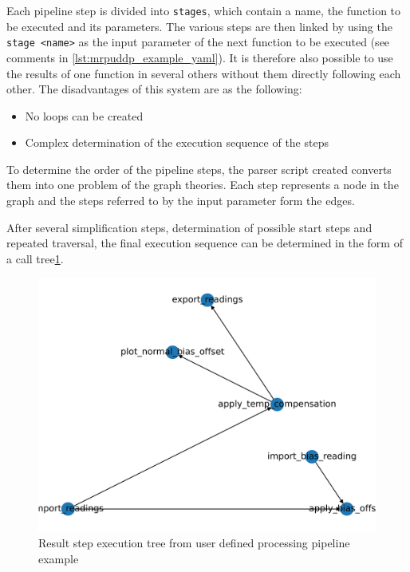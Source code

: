 Each pipeline step is divided into \passthrough{\lstinline!stages!},
which contain a name, the function to be executed and its parameters.
The various steps are then linked by using the
\passthrough{\lstinline!stage <name>!} as the input parameter of the
next function to be executed (see comments in
\ref{lst:mrpuddp_example_yaml}). It is therefore also possible to use
the results of one function in several others without them directly
following each other. The disadvantages of this system are as the
following:

\begin{itemize}
\tightlist
\item
  No loops can be created
\item
  Complex determination of the execution sequence of the steps
\end{itemize}

To determine the order of the pipeline steps, the parser script created
converts them into one problem of the graph theories. Each step
represents a node in the graph and the steps referred to by the input
parameter form the edges.

After several simplification steps, determination of possible start
steps and repeated traversal, the final execution sequence can be
determined in the form of a call
tree\ref{Result_step_execution_tree_from_user_defined_processing_pipeline_example.png}.

\begin{figure}
\centering
\includegraphics{./generated_images/border_Result_step_execution_tree_from_user_defined_processing_pipeline_example.png}
\caption{Result step execution tree from user defined processing
pipeline example
\label{Result_step_execution_tree_from_user_defined_processing_pipeline_example.png}}
\end{figure}

